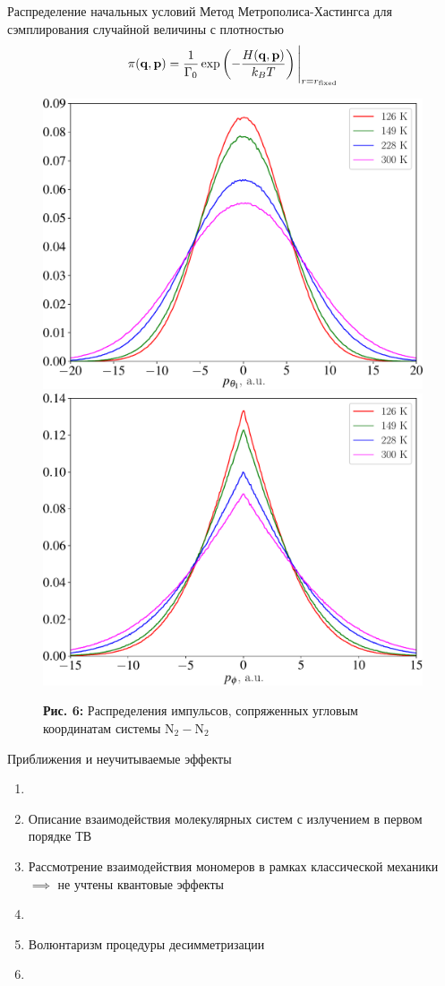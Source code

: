 \documentclass[10pt,usenames,pdf,hyperref={unicode},dvipsnames]{beamer}
\newcommand{\lb}{\left(}
\newcommand{\rb}{\right)}
\newcommand{\mf}{\mathbf}
\newcommand{\mycaption}[2]{
    \textbf{#1:} #2
}
\begin{document}
\begin{frame}{Распределение начальных условий}
    \vspace*{-0.1cm}
	Метод Метрополиса-Хастингса для сэмплирования случайной величины с плотностью  
    \vspace*{-0.1cm}
    \begin{gather}
        \pi(\mf{q}, \mf{p}) = \frac{1}{\Gamma_0} \exp \lb -\frac{H(\mf{q}, \mf{p})}{k_B T} \rb \Bigg{|}_{r = r_\text{fixed}} \notag
    \end{gather}

    \vspace*{-0.5cm}
    \begin{figure}[H]
        \includegraphics[width=0.49\linewidth]{./pictures/pTheta1-crop.pdf}
        \includegraphics[width=0.49\linewidth]{./pictures/pPhi-crop.pdf}
        \mycaption{Рис. 6}{Распределения импульсов, сопряженных угловым координатам системы N$_2-$N$_2$}
    \end{figure}
\end{frame}

\begin{frame}{Приближения и неучитываемые эффекты}
    \begin{enumerate}
        \item \color{red}{Приближение Борна-Оппенгеймера} 
        \item Описание взаимодействия молекулярных систем с излучением в первом порядке ТВ
        \item Рассмотрение взаимодействия мономеров в рамках классической механики $\implies$ не учтены квантовые эффекты
        \item {}
        \item Волюнтаризм процедуры десимметризации
        \item \color{green}{Неучет связанных состояний}
    \end{enumerate}
\end{frame}
\end{document}

